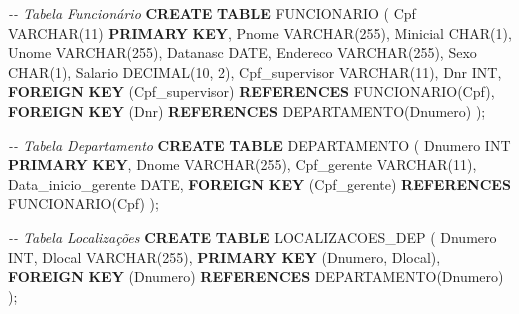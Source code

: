 \documentclass[
]{article}
\newenvironment{Shaded}{\begin{snugshade}}{\end{snugshade}}
\newcommand{\CommentTok}[1]{\textcolor[rgb]{0.56,0.35,0.01}{\textit{#1}}}
\newcommand{\DataTypeTok}[1]{\textcolor[rgb]{0.13,0.29,0.53}{#1}}
\newcommand{\DecValTok}[1]{\textcolor[rgb]{0.00,0.00,0.81}{#1}}
\newcommand{\KeywordTok}[1]{\textcolor[rgb]{0.13,0.29,0.53}{\textbf{#1}}}
\newcommand{\NormalTok}[1]{#1}
\begin{document}
\begin{Shaded}
\begin{Highlighting}[]
\CommentTok{{-}{-} Tabela Funcionário}
\KeywordTok{CREATE} \KeywordTok{TABLE}\NormalTok{ FUNCIONARIO (}
\NormalTok{    Cpf }\DataTypeTok{VARCHAR}\NormalTok{(}\DecValTok{11}\NormalTok{) }\KeywordTok{PRIMARY} \KeywordTok{KEY}\NormalTok{,}
\NormalTok{    Pnome }\DataTypeTok{VARCHAR}\NormalTok{(}\DecValTok{255}\NormalTok{),}
\NormalTok{    Minicial }\DataTypeTok{CHAR}\NormalTok{(}\DecValTok{1}\NormalTok{),}
\NormalTok{    Unome }\DataTypeTok{VARCHAR}\NormalTok{(}\DecValTok{255}\NormalTok{),}
\NormalTok{    Datanasc }\DataTypeTok{DATE}\NormalTok{,}
\NormalTok{    Endereco }\DataTypeTok{VARCHAR}\NormalTok{(}\DecValTok{255}\NormalTok{),}
\NormalTok{    Sexo }\DataTypeTok{CHAR}\NormalTok{(}\DecValTok{1}\NormalTok{),}
\NormalTok{    Salario }\DataTypeTok{DECIMAL}\NormalTok{(}\DecValTok{10}\NormalTok{, }\DecValTok{2}\NormalTok{),}
\NormalTok{    Cpf\_supervisor }\DataTypeTok{VARCHAR}\NormalTok{(}\DecValTok{11}\NormalTok{),}
\NormalTok{    Dnr }\DataTypeTok{INT}\NormalTok{,}
    \KeywordTok{FOREIGN} \KeywordTok{KEY}\NormalTok{ (Cpf\_supervisor) }\KeywordTok{REFERENCES}\NormalTok{ FUNCIONARIO(Cpf),}
    \KeywordTok{FOREIGN} \KeywordTok{KEY}\NormalTok{ (Dnr) }\KeywordTok{REFERENCES}\NormalTok{ DEPARTAMENTO(Dnumero)}
\NormalTok{);}
\end{Highlighting}
\end{Shaded}

\begin{Shaded}
\begin{Highlighting}[]
\CommentTok{{-}{-} Tabela Departamento}
\KeywordTok{CREATE} \KeywordTok{TABLE}\NormalTok{ DEPARTAMENTO (}
\NormalTok{    Dnumero }\DataTypeTok{INT} \KeywordTok{PRIMARY} \KeywordTok{KEY}\NormalTok{,}
\NormalTok{    Dnome }\DataTypeTok{VARCHAR}\NormalTok{(}\DecValTok{255}\NormalTok{),}
\NormalTok{    Cpf\_gerente }\DataTypeTok{VARCHAR}\NormalTok{(}\DecValTok{11}\NormalTok{),}
\NormalTok{    Data\_inicio\_gerente }\DataTypeTok{DATE}\NormalTok{,}
    \KeywordTok{FOREIGN} \KeywordTok{KEY}\NormalTok{ (Cpf\_gerente) }\KeywordTok{REFERENCES}\NormalTok{ FUNCIONARIO(Cpf)}
\NormalTok{);}
\end{Highlighting}
\end{Shaded}

\begin{Shaded}
\begin{Highlighting}[]
\CommentTok{{-}{-} Tabela Localizações}
\KeywordTok{CREATE} \KeywordTok{TABLE}\NormalTok{ LOCALIZACOES\_DEP (}
\NormalTok{    Dnumero }\DataTypeTok{INT}\NormalTok{,}
\NormalTok{    Dlocal }\DataTypeTok{VARCHAR}\NormalTok{(}\DecValTok{255}\NormalTok{),}
    \KeywordTok{PRIMARY} \KeywordTok{KEY}\NormalTok{ (Dnumero, Dlocal),}
    \KeywordTok{FOREIGN} \KeywordTok{KEY}\NormalTok{ (Dnumero) }\KeywordTok{REFERENCES}\NormalTok{ DEPARTAMENTO(Dnumero)}
\NormalTok{);}
\end{Highlighting}
\end{Shaded}
\end{document}
